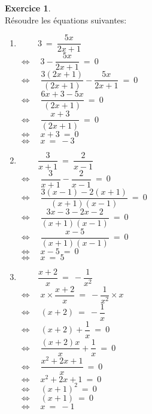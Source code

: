 \documentclass[10pt,a4paper]{article}
\theoremstyle{definition}
\theoremstyle{definition}
\newtheorem{exo}{Exercice}
\begin{document}
\begin{center}
\begin{minipage}[c]{0.4\linewidth}
	\end{minipage}
	\hfill\vrule\hfill
	\begin{minipage}[c]{0.4\linewidth}
		\raggedright
		\begin{exo}\hfill\textbf{}\\
		Résoudre les équations suivantes:\\[3mm]
		\begin{enumerate}
			
			\item $ \quad\quad~3 \ = \ \dfrac{5x}{2x+1}$\\[3mm]
			$\Leftrightarrow\quad 3 - \dfrac{5x}{2x+1} \ = \ 0$\\[3mm]
			$\Leftrightarrow\quad \dfrac{3(2x+1)}{(2x+1)} - \dfrac{5x}{2x+1} \ = \ 0$\\[3mm]
			$\Leftrightarrow\quad \dfrac{6x+3-5x}{(2x+1)} \ = \ 0$\\[3mm]
			$\Leftrightarrow\quad \dfrac{x+3}{(2x+1)} \ = \ 0$\\[3mm]
			$ \Leftrightarrow\quad x+3\ = \ 0$\\[3mm]
			$ \Leftrightarrow\quad x \ = \ -3$\\[5mm]
			
			
			
			\item $\quad\quad~\dfrac{3}{x+1} \ = \  \dfrac{2}{x-1}$\\[3mm]
			$\Leftrightarrow\quad \dfrac{3}{x+1} -  \dfrac{2}{x-1} \ = \ 0$\\[3mm]
			$\Leftrightarrow\quad \dfrac{3(x-1) - 2(x+1)}{(x+1)(x-1)} \ = \ 0$\\[3mm]
			$\Leftrightarrow\quad \dfrac{3x-3 - 2x-2}{(x+1)(x-1)} \ = \ 0$\\[3mm]
			$\Leftrightarrow\quad \dfrac{x-5}{(x+1)(x-1)} \ = \ 0$\\[3mm]
			$ \Leftrightarrow\quad x-5\ = \ 0$\\[3mm]
			$ \Leftrightarrow\quad x \ = \ 5$\\[5mm]
			
			
			\item $\quad\quad~\dfrac{x+2}{x} \ = \  - \dfrac{1}{x^2}$\\[3mm]
			$\Leftrightarrow\quad x\times\dfrac{x+2}{x} \ = \  - \dfrac{1}{x^2}\times x$\\[3mm]
			$\Leftrightarrow\quad (x+2) \ = \  - \dfrac{1}{x}$\\[3mm]
			$\Leftrightarrow\quad (x+2)  + \dfrac{1}{x} \ = \ 0$\\[3mm]
			$\Leftrightarrow\quad \dfrac{(x+2)x}{x}  + \dfrac{1}{x} \ = \ 0$\\[3mm]
			$\Leftrightarrow\quad \dfrac{x^2+2x+1}{x}  \ = \ 0$\\[3mm]
			$\Leftrightarrow\quad x^2+2x+1  \ = \ 0$\\[3mm]
			$\Leftrightarrow\quad (x+1)^2 \ = \ 0$\\[3mm]
			$\Leftrightarrow\quad (x+1) \ = \ 0$\\[3mm]
			$\Leftrightarrow\quad x \ = \ -1$\\[3mm]
			

\end{enumerate}
\end{exo}
\end{minipage}
\end{center}
\end{document}
